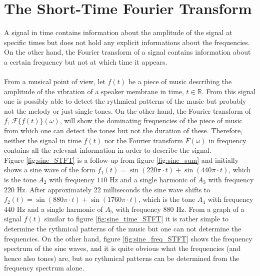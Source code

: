 \section{The Short-Time Fourier Transform} \label{sec:STFT}
A signal in time contains information about the amplitude of the signal at specific times but does not hold any explicit informations about the frequencies. On the other hand, the Fourier transform of a signal contains information about a certain frequency but not at which time it appears.
\\ \\
From a musical point of view, let $f(t)$ be a piece of music describing the amplitude of the vibration of a speaker membrane in time, $t \in \mathbb{R}$. From this signal one is possibly able to detect the rythmical patterns of the music but probably not the melody or just single tones. On the other hand, the Fourier transform of $f$, $\mathcal{F}\{f(t)\}(\omega)$, will show the dominating frequencies of the piece of music from which one can detect the tones but not the duration of these. Therefore, neither the signal in time $f(t)$ nor the Fourier transform $F(\omega)$ in frequency contains all the relevant information in order to describe the signal.
\\
Figure \ref{fig:sine_STFT} is a follow-up from figure \ref{fig:sine_sum} and initially shows a sine wave of the form $f_1(t) = \sin(220\pi\cdot t) + \sin(440\pi\cdot t)$, which is the tone $A_2$ with frequency $110$ Hz and a single harmonic of $A_3$ with frequency $220$ Hz. After approximately 22 milliseconds the sine wave shifts to $f_2(t) = \sin(880\pi\cdot t) + \sin(1760\pi\cdot t)$, which is the tone $A_4$ with frequency $440$ Hz and a single harmonic of $A_5$ with frequency $880$ Hz. From a graph of a signal $f(t)$ similar to figure \ref{fig:sine_time_STFT} it is rather simple to determine the rythmical patterns of the music but one can not determine the frequencies. On the other hand, figure \ref{fig:sine_freq_STFT} shows the frequency spectrum of the sine waves, and it is quite obvious what the frequencies (and hence also tones) are, but no rythmical patterns can be determined from the frequency spectrum alone.

